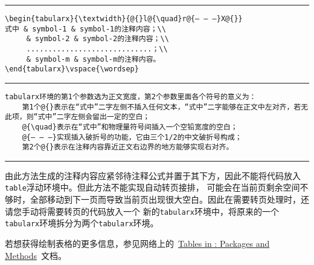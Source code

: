 \vspace{1em}\noindent\hrule

\begin{verbatim}
\begin{tabularx}{\textwidth}{@{}l@{\quad}r@{— — —}X@{}}
式中 & symbol-1 & symbol-1的注释内容；\\
     & symbol-2 & symbol-2的注释内容；\\
     .............................；\\
     & symbol-m & symbol-m的注释内容。
\end{tabularx}\vspace{\wordsep}
\end{verbatim}

\noindent\hrule

\begin{verbatim}
tabularx环境的第1个参数选为正文宽度，第2个参数里面各个符号的意义为：
    第1个@{}表示在“式中”二字左侧不插入任何文本，“式中”二字能够在正文中左对齐，若无此项，则“式中”二字左侧会留出一定的空白；
    @{\quad}表示在“式中”和物理量符号间插入一个空铅宽度的空白；
    @{— — —}实现插入破折号的功能，它由三个1/2的中文破折号构成；
    第2个@{}表示在注释内容靠近正文右边界的地方能够实现右对齐。
\end{verbatim}

\noindent\hrule\vspace{1em}

由此方法生成的注释内容应紧邻待注释公式并置于其下方，因此不能将代码放入\verb|table|浮动环境中。但此方法不能实现自动转页接排，
可能会在当前页剩余空间不够时，全部移动到下一页而导致当前页出现很大空白。因此在需要转页处理时，还请您手动将需要转页的代码放入一个
新的\verb|tabularx|环境中，将原来的一个\verb|tabularx|环境拆分为两个\verb|tabularx|环境。

若想获得绘制表格的更多信息，参见网络上的~\href{http://www.tug.org/pracjourn/2007-1/mori/}{Tables in \LaTeXe: Packages and Methods}~文档。

